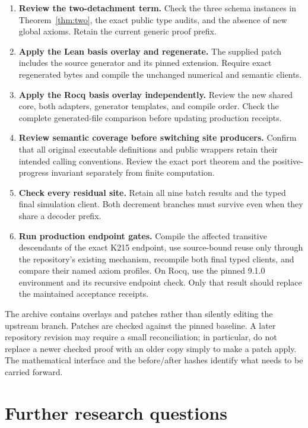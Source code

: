 \documentclass[11pt,letterpaper]{article}
\begin{document}
\begin{enumerate}
\item \textbf{Review the two-detachment term.} Check the three schema instances
      in Theorem~\ref{thm:two}, the exact public type audits, and the absence of
      new global axioms. Retain the current generic proof prefix.
\item \textbf{Apply the Lean basis overlay and regenerate.} The supplied patch
      includes the source generator and its pinned extension. Require exact
      regenerated bytes and compile the unchanged numerical and semantic clients.
\item \textbf{Apply the Rocq basis overlay independently.} Review the new shared
      core, both adapters, generator templates, and compile order. Check the
      complete generated-file comparison before updating production receipts.
\item \textbf{Review semantic coverage before switching site producers.} Confirm
      that all original executable definitions and public wrappers retain their
      intended calling conventions. Review the exact port theorem and the
      positive-progress invariant separately from finite computation.
\item \textbf{Check every residual site.} Retain all nine batch results and the
      typed final simulation client. Both decrement branches must survive even
      when they share a decoder prefix.
\item \textbf{Run production endpoint gates.} Compile the affected transitive
      descendants of the exact K215 endpoint, use source-bound reuse only through
      the repository's existing mechanism, recompile both final typed clients,
      and compare their named axiom profiles. On Rocq, use the pinned 9.1.0
      environment and its recursive endpoint check. Only that result should
      replace the maintained acceptance receipts.
\end{enumerate}

The archive contains overlays and patches rather than silently editing the
upstream branch. Patches are checked against the pinned baseline. A later
repository revision may require a small reconciliation; in particular, do not
replace a newer checked proof with an older copy simply to make a patch apply.
The mathematical interface and the before/after hashes identify what needs
to be carried forward.

\section{Further research questions}
\end{document}
